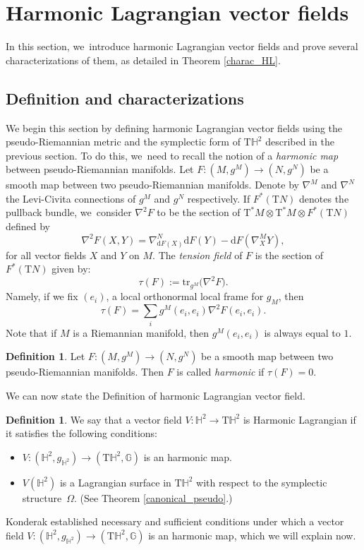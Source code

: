 \documentclass[11pt]{article}
\theoremstyle{plain}
\theoremstyle{definition}
\newtheorem{defi}[cor]{Definition}
\begin{document}
\section{Harmonic Lagrangian vector fields}\label{sec5_harmo}

In this section, we~introduce harmonic Lagrangian vector fields and prove several characterizations of them, as detailed in Theorem \ref{charac_HL}.

\subsection{Definition and characterizations}
We begin this section by defining harmonic Lagrangian vector fields using the pseudo-Riemannian metric and the symplectic form of $\mathrm{T}\mathbb{H}^2$ described in the previous section. To do this, we~need to recall the notion of a \emph{harmonic map} between pseudo-Riemannian manifolds.
Let $F:(M,g^M)\to(N,g^N)$ be a smooth map between two pseudo-Riemannian manifolds. Denote by $\nabla^{M}$ and $\nabla^{N}$ the Levi-Civita connections of $g^M$ and $g^N$ respectively. If $F^*(\mathrm{T}N)$
denotes the pullback bundle, we~consider $\nabla^2F$ to be the section of $\mathrm{T}^*M\otimes \mathrm{T}^*M\otimes F^*(\mathrm{T}N)$ defined by
\[
\nabla^2F(X,Y)=\nabla_{\mathrm{d}F(X)}^{N}\mathrm{d}F(Y)-\mathrm{d}F(\nabla^{M}_XY),
\]
for all vector fields $X$ and $Y$ on $M$.
The \emph{tension field} of $F$ is the section of $F^*(\mathrm{T}N)$ given by:
\[
\tau(F):=\mathrm{tr}_{g^{M}}\big(\nabla^2F \big).
\]
Namely, if we fix $(e_i)$, a local orthonormal local frame for $g_M$, then
\[
\tau(F)=\sum_{i}g^M(e_i,e_i)\nabla^2F(e_i,e_i).
\]
Note that if $M$ is a Riemannian manifold, then $g^{M}(e_i,e_i)$ is always equal to $1$.
\begin{defi}\label{harmonic_def}
Let $F:(M,g^M)\to(N,g^N)$ be a smooth map between two pseudo-Riemannian manifolds. Then $F$ is called \emph{harmonic} if $\tau(F)=0$.
\end{defi}
We can now state the Definition of harmonic Lagrangian vector field.
\begin{defi}\label{def1}
We say that a vector field $V:\mathbb{H}^2\to\mathrm{T}\mathbb{H}^2$ is Harmonic Lagrangian if it satisfies the following conditions:
\begin{itemize}
\item $V:(\mathbb{H}^2,g_{\mathbb{H}^2})\to(\mathrm{T}\mathbb{H}^2,\mathbb{G})$ is an harmonic map.
\item $V(\mathbb{H}^2)$ is a Lagrangian surface in $\mathrm{T}\mathbb{H}^2$ with respect to the symplectic structure~$\Omega$. (See Theorem \ref{canonical_pseudo}.)
\end{itemize}
\end{defi}
Konderak \cite{on_harmonic_vector_field} established necessary and sufficient conditions under which a vector field $V:(\mathbb{H}^2,g_{\mathbb{H}^2})\to(\mathrm{T}\mathbb{H}^2,\mathbb{G})$ is an harmonic map, which we will explain now.
\end{document}
